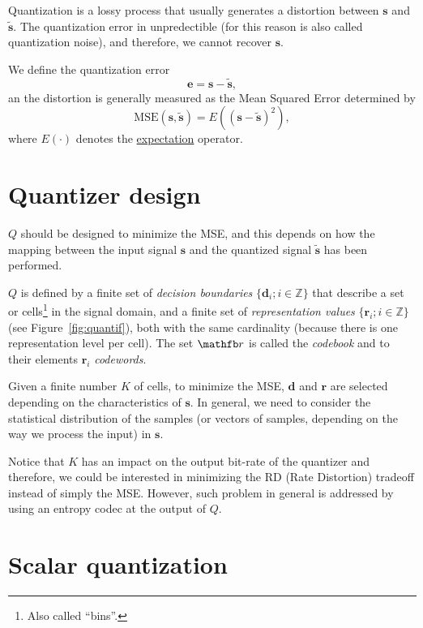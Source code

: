 Quantization is a lossy process that usually generates a distortion
between ${\mathbf s}$ and $\tilde{\mathbf s}$. The quantization error in unpredectible (for this reason is also called quantization noise), and therefore, we cannot recover ${\mathbf s}$.

We define the quantization error
\begin{equation}
  {\mathbf e} = {\mathbf s} - \tilde{{\mathbf s}},
\end{equation}
an the distortion is generally measured as the Mean Squared Error
determined by
\begin{equation}
  \text{MSE}({\mathbf s}, \tilde{\mathbf s}) = E(({\mathbf s} - \tilde{\mathbf s})^2),
  \label{eq:MSE}
\end{equation}
where $E(\cdot)$ denotes the
\href{https://en.wikipedia.org/wiki/Expected_value}{expectation}
operator.

\section{Quantizer design}

$Q$ should be designed to minimize the MSE, and this depends on how
the mapping between the input signal ${\mathbf s}$ and the quantized
signal $\tilde{\mathbf s}$ has been performed.

$Q$ is defined by a finite set of \emph{decision boundaries}
$\{{\mathbf d}_i; i\in {\mathbb{Z}}\}$ that describe a set or
cells\footnote{Also called ``bins''.} in the signal domain, and a
finite set of \emph{representation values} $\{{\mathbf r}_i; i\in
{\mathbb{Z}}\}$ (see Figure~\ref{fig:quantif}), both with the same
cardinality (because there is one representation level per cell). The
set ${\mathfb r}$ is called the \emph{codebook} and to their elements
${\mathbf r}_i$ \emph{codewords}.

Given a finite number $K$ of cells, to minimize the MSE, ${\mathbf d}$
and ${\mathbf r}$ are selected depending on the characteristics of
${\mathbf s}$. In general, we need to consider the statistical
distribution of the samples (or vectors of samples, depending on the
way we process the input) in ${\mathbf s}$.

Notice that $K$ has an impact on the output bit-rate of the quantizer
and therefore, we could be interested in minimizing the RD (Rate
Distortion) tradeoff instead of simply the MSE. However, such problem
in general is addressed by using an entropy codec at the output of
$Q$.

\section{Scalar quantization}


